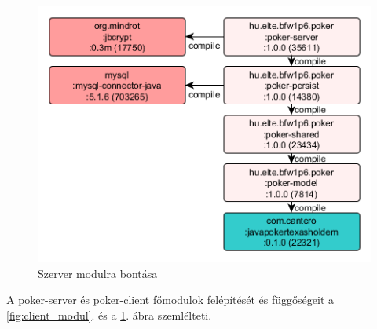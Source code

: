 \begin{figure}[h!]
	\caption{Szerver modulra bontása}
	\label{fig:server_modul}
	\centering
	\includegraphics[width=\linewidth]{developer-documentation/images/poker-server-deps.png}
\end{figure}
A poker-server és poker-client főmodulok felépítését és függőségeit a \ref{fig:client_modul}. és a \ref{fig:server_modul}. ábra szemlélteti.

\clearpage

